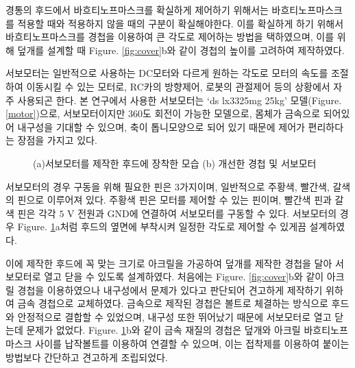 경통의 후드에서 바흐티노프마스크를 확실하게 제어하기 위해서는 바흐티노프마스크를 적용할 때와 적용하지 않을 때의 구분이 확실해야한다. 이를 확실하게 하기 위해서 바흐티노프마스크를 경첩을 이용하여 큰 각도로 제어하는 방법을 택하였으며, 이를 위해 덮개를 설계할 때 \textrm{Figure}. \ref{fig:cover}b와 같이 경첩의 높이를 고려하여 제작하였다.

서보모터는 일반적으로 사용하는 DC모터와 다르게 원하는 각도로 모터의 속도를 조절하여 이동시킬 수 있는 모터로,  RC카의 방향제어, 로봇의 관절제어 등의 상황에서 자주 사용되곤 한다. 본 연구에서 사용한 서보모터는 ‘ds lx3325mg 25kg’ 모델(\textrm{Figure}. \ref{motor})으로, 서보모터이지만 360도 회전이 가능한 모델으로, 몸체가 금속으로 되어있어 내구성을 기대할 수 있으며, 축이 톱니모양으로 되어 있기 때문에 제어가 편리하다는 장점을 가지고 있다.



\begin{figure}[ht]
	\begin{center}
	\end{center}
	\caption{(a)서보모터를 제작한 후드에 장착한 모습 (b) 개선한 경첩 및 서보모터}
	\label{servohinge}
\end{figure}

서보모터의 경우 구동을 위해 필요한 핀은 3가지이며, 일반적으로 주황색, 빨간색, 갈색의 핀으로 이루어져 있다. 주황색 핀은 모터를 제어할 수 있는 핀이며, 빨간색 핀과 갈색 핀은 각각 $\textrm{5 V}$ 전원과 GND에 연결하여 서보모터를 구동할 수 있다. 서보모터의 경우 \textrm{Figure}. \ref{servohinge}a처럼 후드의 옆면에 부착시켜 일정한 각도로 제어할 수 있게끔 설계하였다.

이에 제작한 후드에 꼭 맞는 크기로 아크릴을 가공하여 덮개를 제작한 경첩을 달아 서보모터로 열고 닫을 수 있도록 설계하였다. 처음에는 \textrm{Figure}. \ref{fig:cover}b와 같이 아크릴 경첩을 이용하였으나 내구성에서 문제가 있다고 판단되어 견고하게 제작하기 위하여 금속 경첩으로 교체하였다. 금속으로 제작된 경첩은 볼트로 체결하는 방식으로 후드와 안정적으로 결합할 수 있었으며, 내구성 또한 뛰어났기 때문에 서보모터로 열고 닫는데 문제가 없었다. \textrm{Figure}. \ref{servohinge}b와 같이 금속 재질의 경첩은 덮개와 아크릴 바흐티노프 마스크 사이를 납작볼트를 이용하여 연결할 수 있으며, 이는 접착제를 이용하여 붙이는 방법보다 간단하고 견고하게 조립되었다.


